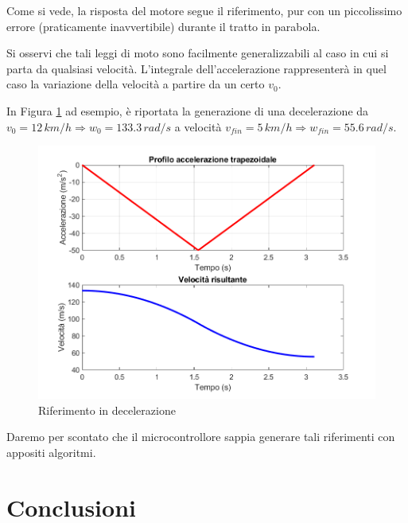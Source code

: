 \documentclass[a4paper,12pt]{article}
\begin{document}
\vspace{0.5cm}

Come si vede, la risposta del motore segue il riferimento, pur con un piccolissimo errore (praticamente inavvertibile) durante il tratto in parabola.

\vspace{0.3cm}

Si osservi che tali leggi di moto sono facilmente generalizzabili al caso in cui si parta da qualsiasi velocità. L'integrale dell'accelerazione rappresenterà in quel caso la variazione della velocità a partire da un certo $v_0$.

In Figura \ref{fig: decelazione} ad esempio, è riportata la generazione di una decelerazione da $v_0=12\,km/h \Rightarrow w_{0}=133.3\,rad/s $ a velocità $v_{fin}=5\,km/h\Rightarrow w_{fin}=55.6\,rad/s$.

\vspace{0.5cm}

\begin{figure}[h!]
    \centering
    \includegraphics[scale = 0.5]{Immagini/PlotMatlab/leggiMotoDecelerazione.png}
    \caption{Riferimento in decelerazione}
    \label{fig: decelazione}
\end{figure}

\vspace{0.5cm}

Daremo per scontato che il microcontrollore sappia generare tali riferimenti con appositi algoritmi.

\newpage


\section{Conclusioni}
\end{document}
